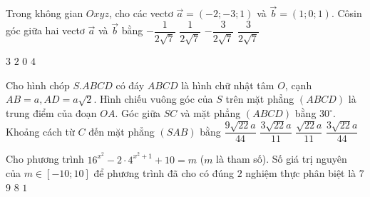 \begin{ex}%
Trong không gian $O x y z$, cho các vectơ $\vec{a}=(-2;-3; 1)$ và $\vec{b}= (1; 0; 1)$. Côsin góc giữa hai vectơ $\vec{a}$ và $\vec{b}$ bằng
\choice
{\True $-\dfrac{1}{2\sqrt{7}}$}
{$\dfrac{1}{2\sqrt{7}}$}
{$-\dfrac{3}{2\sqrt{7}}$}
{$\dfrac{3}{2\sqrt{7}}$}

\end{ex}
\begin{ex}%
{\vspace{-0.5cm}

}
\choice
{$3$}
{\True $2$}
{$0$}
{$4$}
\end{ex}
\begin{ex}%
Cho hình chóp $S.ABCD$ có đáy $ABCD$ là hình chữ nhật tâm $O$, cạnh $AB=a, AD=a \sqrt{2}$. Hình chiếu vuông góc của $S$ trên mặt phẳng $(ABCD)$ là trung điểm của đoạn $OA$. Góc giữa $SC$ và mặt phẳng $(ABCD)$ bằng $30^{\circ}$. Khoảng cách từ $C$ đến mặt phẳng $(SAB)$ bằng
\choice
{$\dfrac{9\sqrt{22} a}{44}$}
{\True $\dfrac{3\sqrt{22} a}{11}$}
{$\dfrac{\sqrt{22} a}{11}$}
{$\dfrac{3\sqrt{22} a}{44}$}

\end{ex}
\begin{ex}%
Cho phương trình $16^{x^2}-2\cdot 4^{x^2+1}+10=m$ ($m$ là tham số). Số giá trị nguyên của $m \in[-10; 10]$ để phương trình đã cho có đúng $2$ nghiệm thực phân biệt là
\choice
{$7$}
{\True $9$}
{$8$}
{$1$}

\end{ex}


